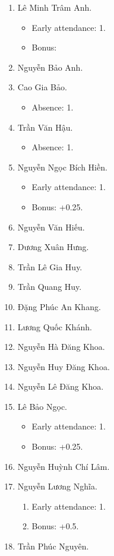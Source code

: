 \documentclass{article}
\begin{document}
\begin{enumerate}
	\item {\sc Lê Minh Trâm Anh.}
	\begin{itemize}
		\item Early attendance: 1.
		\item Bonus: 
	\end{itemize}
	\item {\sc Nguyễn Bảo Anh.}
	\item {\sc Cao Gia Bảo.}
	\begin{itemize}
		\item Absence: 1.
	\end{itemize}
	\item {\sc Trần Văn Hậu.}
	\begin{itemize}
		\item Absence: 1.
	\end{itemize}
	\item {\sc Nguyễn Ngọc Bích Hiền.}
	\begin{itemize}
		\item Early attendance: 1.
		\item Bonus: +0.25.
	\end{itemize}
	\item {\sc Nguyễn Văn Hiếu.}
	\item {\sc Dương Xuân Hưng.}
	\item {\sc Trần Lê Gia Huy.}
	\item {\sc Trần Quang Huy.}
	\item {\sc Đặng Phúc An Khang.}
	\item {\sc Lương Quốc Khánh.}
	\item {\sc Nguyễn Hà Đăng Khoa}.
	\item {\sc Nguyễn Huy Đăng Khoa.}
	\item {\sc Nguyễn Lê Đăng Khoa.}
	\item {\sc Lê Bảo Ngọc.}
	\begin{itemize}
		\item Early attendance: 1.
		\item Bonus: +0.25.
	\end{itemize}
	\item {\sc Nguyễn Huỳnh Chí Lâm.}
	\item {\sc Nguyễn Lương Nghĩa.}
	\begin{enumerate}
		\item Early attendance: 1.
		\item Bonus: +0.5.
	\end{enumerate}
	\item {\sc Trần Phúc Nguyên.}

\end{enumerate}
\end{document}
